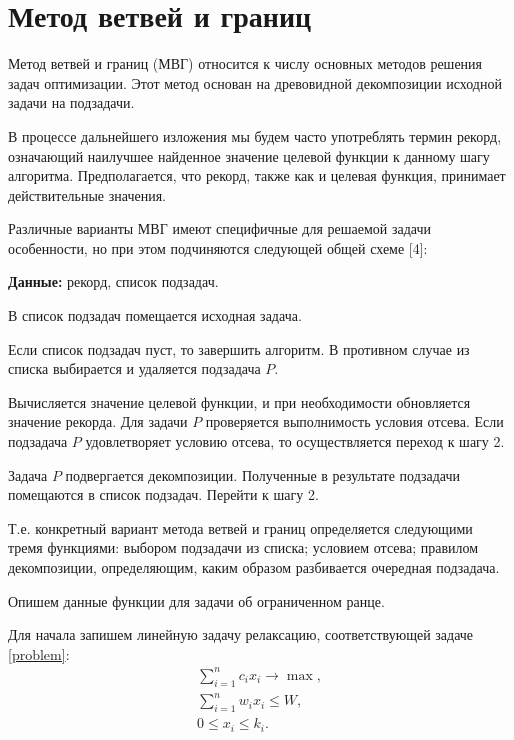 \documentclass[12pt, a4paper]{article}
\begin{document}
\section{Метод ветвей и границ}

Метод ветвей и границ (МВГ) относится к числу основных методов решения задач оптимизации. Этот метод основан на древовидной декомпозиции исходной задачи на подзадачи.

В процессе дальнейшего изложения мы будем часто употреблять термин рекорд, означающий наилучшее найденное значение целевой функции к данному шагу алгоритма. Предполагается, что рекорд, также как и целевая функция, принимает действительные значения.

Различные варианты МВГ имеют специфичные для решаемой задачи особенности, но при этом подчиняются следующей общей схеме [4]:

\textbf{Данные:} рекорд, список подзадач.

\begin{STEP}
\item В список подзадач помещается исходная задача.
\item Если список подзадач пуст, то завершить алгоритм. В противном случае из списка выбирается и удаляется подзадача $P$.
\item Вычисляется значение целевой функции, и при необходимости обновляется значение рекорда. Для задачи $P$ проверяется выполнимость условия отсева. Если подзадача $P$ удовлетворяет условию отсева, то осуществляется переход к шагу 2.
\item Задача $P$ подвергается декомпозиции. Полученные в результате подзадачи помещаются в список подзадач. Перейти к шагу 2.
\end{STEP}

Т.е. конкретный вариант метода ветвей и границ определяется следующими тремя функциями: выбором подзадачи из списка; условием отсева; правилом декомпозиции, определяющим, каким образом разбивается очередная подзадача.

Опишем данные функции для задачи об ограниченном ранце.

Для начала запишем линейную задачу релаксацию, соответствующей задаче \eqref{problem}:
\begin{equation}
	\label{relax_problem}
	\begin{gathered}
		\sum_{i=1}^{n} c_i x_i \rightarrow \max, \\
		\sum_{i=1}^{n} w_i x_i \le W, \\
		0 \le x_i \le k_i.
	\end{gathered}
\end{equation}
\end{document}
